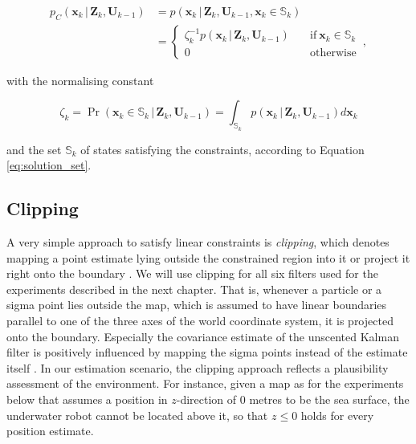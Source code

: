 \begin{equation}\label{eq:constraint_pdf}
\begin{split}
p_C(\bm{x}_k\,|\,\bm{Z}_{k}, \bm{U}_{k-1}) &= p(\bm{x}_k\,|\,\bm{Z}_{k}, \bm{U}_{k-1}, \bm{x}_{k} \in \bm{\mathbb{S}}_k) \\
  &= \begin{cases}
  	\zeta_k^{-1} p(\bm{x}_k\,|\,\bm{Z}_{k}, \bm{U}_{k-1}) & \quad \mathrm{if}\:\bm{x}_{k} \in \bm{\mathbb{S}}_k \\
  	0 & \quad \mathrm{otherwise}
  \end{cases}\,,
\end{split}
\end{equation}

\noindent
with the normalising constant

\begin{equation}
  \zeta_k = \operatorname{Pr}(\bm{x}_{k} \in \bm{\mathbb{S}}_k\,|\,\bm{Z}_{k}, \bm{U}_{k-1}) = \int_{\bm{\mathbb{S}}_k} p(\bm{x}_k\,|\,\bm{Z}_{k}, \bm{U}_{k-1}) d \bm{x}_{k}
\end{equation}

\noindent
and the set $\bm{\mathbb{S}}_k$ of states satisfying the constraints, according to Equation \ref{eq:solution_set}.

\subsection{Clipping}

A very simple approach to satisfy linear constraints is \emph{clipping}, which denotes mapping a point estimate lying outside the constrained region into it or project it right onto the boundary \cite{simon2006optimal}. We will use clipping for all six filters used for the experiments described in the next chapter. That is, whenever a particle or a sigma point lies outside the map, which is assumed to have linear boundaries parallel to one of the three axes of the world coordinate system, it is projected onto the boundary. Especially the covariance estimate of the unscented Kalman filter is positively influenced by mapping the sigma points instead of the estimate itself \cite{KANDEPU2008753}. In our estimation scenario, the clipping approach reflects a plausibility assessment of the environment. For instance, given a map as for the experiments below that assumes a position in $z$-direction of $0$ metres to be the sea surface, the underwater robot cannot be located above it, so that $z \leq 0$ holds for every position estimate. 



